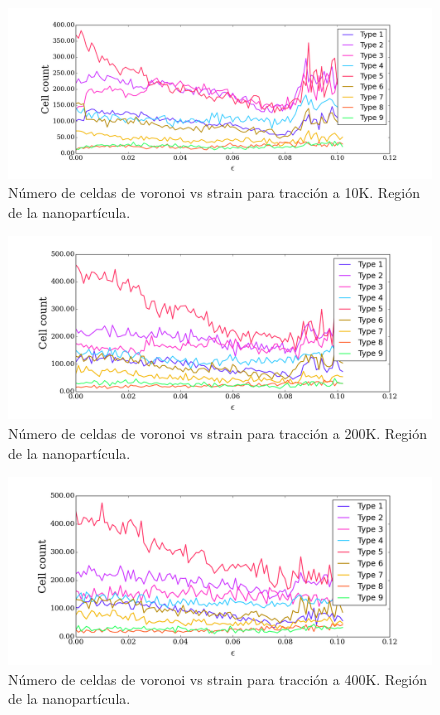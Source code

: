 \documentclass[10pt, oneside]{article} %
\begin{document}
\begin{figure}[H]
\centering
\includegraphics[width=15cm]{Figures/NanoParticles/voro_group_10K.png}
\caption{Número de celdas de voronoi vs strain para tracción a 10K. Región de la nanopartícula.}
\end{figure}

\begin{figure}[H]
\centering
\includegraphics[width=15cm]{Figures/NanoParticles/voro_group_200K.png}
\caption{Número de celdas de voronoi vs strain para tracción a 200K. Región de la nanopartícula.}
\end{figure}

\begin{figure}[H]
\centering
\includegraphics[width=15cm]{Figures/NanoParticles/voro_group_400K.png}
\caption{Número de celdas de voronoi vs strain para tracción a 400K. Región de la nanopartícula.}
\end{figure}
\end{document}
